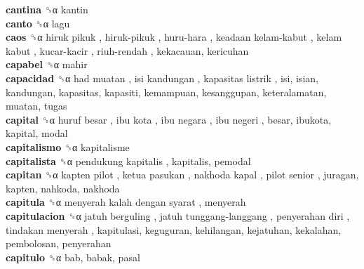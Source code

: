 \textbf{cantina} ␝α  kantin  \\
\textbf{canto} ␝α  lagu  \\
\textbf{caos} ␝α   hiruk pikuk ,  hiruk-pikuk ,  huru-hara ,  keadaan kelam-kabut ,  kelam kabut ,  kucar-kacir ,  riuh-rendah , kekacauan, kericuhan  \\
\textbf{capabel} ␝α  mahir  \\
\textbf{capacidad} ␝α   had muatan ,  isi kandungan ,  kapasitas listrik , isi, isian, kandungan, kapasitas, kapasiti, kemampuan, kesanggupan, keteralamatan, muatan, tugas  \\
\textbf{capital} ␝α   huruf besar ,  ibu kota ,  ibu negara ,  ibu negeri , besar, ibukota, kapital, modal  \\
\textbf{capitalismo} ␝α  kapitalisme  \\
\textbf{capitalista} ␝α   pendukung kapitalis , kapitalis, pemodal  \\
\textbf{capitan} ␝α   kapten pilot ,  ketua pasukan ,  nakhoda kapal ,  pilot senior , juragan, kapten, nahkoda, nakhoda  \\
\textbf{capitula} ␝α   menyerah kalah dengan syarat , menyerah  \\
\textbf{capitulacion} ␝α   jatuh berguling ,  jatuh tunggang-langgang ,  penyerahan diri ,  tindakan menyerah , kapitulasi, keguguran, kehilangan, kejatuhan, kekalahan, pembolosan, penyerahan  \\
\textbf{capitulo} ␝α  bab, babak, pasal  \\
